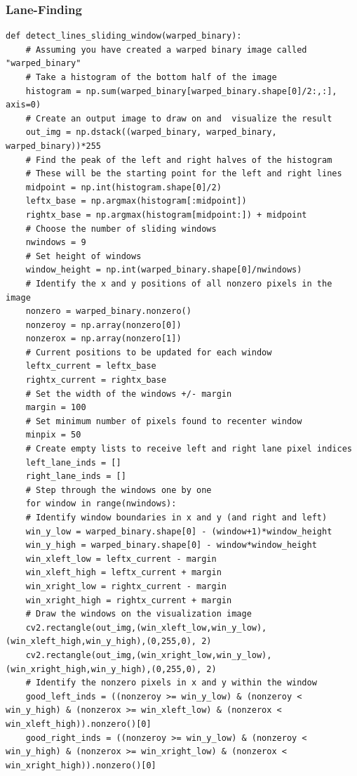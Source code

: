 \documentclass[11pt]{article}
\begin{document}
\subsubsection*{Lane-Finding}
\label{sec-2-3-3}

\begin{verbatim}
def detect_lines_sliding_window(warped_binary):
    # Assuming you have created a warped binary image called "warped_binary"
    # Take a histogram of the bottom half of the image
    histogram = np.sum(warped_binary[warped_binary.shape[0]/2:,:], axis=0)
    # Create an output image to draw on and  visualize the result
    out_img = np.dstack((warped_binary, warped_binary, warped_binary))*255
    # Find the peak of the left and right halves of the histogram
    # These will be the starting point for the left and right lines
    midpoint = np.int(histogram.shape[0]/2)
    leftx_base = np.argmax(histogram[:midpoint])
    rightx_base = np.argmax(histogram[midpoint:]) + midpoint
    # Choose the number of sliding windows
    nwindows = 9
    # Set height of windows
    window_height = np.int(warped_binary.shape[0]/nwindows)
    # Identify the x and y positions of all nonzero pixels in the image
    nonzero = warped_binary.nonzero()
    nonzeroy = np.array(nonzero[0])
    nonzerox = np.array(nonzero[1])
    # Current positions to be updated for each window
    leftx_current = leftx_base
    rightx_current = rightx_base
    # Set the width of the windows +/- margin
    margin = 100
    # Set minimum number of pixels found to recenter window
    minpix = 50
    # Create empty lists to receive left and right lane pixel indices
    left_lane_inds = []
    right_lane_inds = []
    # Step through the windows one by one
    for window in range(nwindows):
	# Identify window boundaries in x and y (and right and left)
	win_y_low = warped_binary.shape[0] - (window+1)*window_height
	win_y_high = warped_binary.shape[0] - window*window_height
	win_xleft_low = leftx_current - margin
	win_xleft_high = leftx_current + margin
	win_xright_low = rightx_current - margin
	win_xright_high = rightx_current + margin
	# Draw the windows on the visualization image
	cv2.rectangle(out_img,(win_xleft_low,win_y_low),(win_xleft_high,win_y_high),(0,255,0), 2) 
	cv2.rectangle(out_img,(win_xright_low,win_y_low),(win_xright_high,win_y_high),(0,255,0), 2) 
	# Identify the nonzero pixels in x and y within the window
	good_left_inds = ((nonzeroy >= win_y_low) & (nonzeroy < win_y_high) & (nonzerox >= win_xleft_low) & (nonzerox < win_xleft_high)).nonzero()[0]
	good_right_inds = ((nonzeroy >= win_y_low) & (nonzeroy < win_y_high) & (nonzerox >= win_xright_low) & (nonzerox < win_xright_high)).nonzero()[0]

\end{verbatim}
\end{document}
